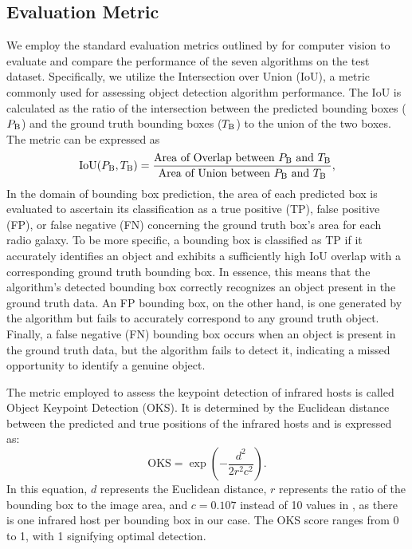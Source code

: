 \documentclass[
  journal=pasa,
  manuscript=research-paper, %
  year=2020,
  volume=37,
]{cup-journal}
\begin{document}
\subsection{Evaluation Metric}
We employ the standard evaluation metrics outlined by \cite{coco14} for computer vision to evaluate and compare the performance of the seven algorithms on the test dataset. 
Specifically, we utilize the Intersection over Union (IoU), a metric commonly used for assessing object detection algorithm performance. 
The IoU is calculated as the ratio of the intersection between the predicted bounding boxes ($P_{\rm B}$) and the ground truth bounding boxes ($T_{\rm B}$) to the union of the two boxes. The metric can be expressed as
\begin{equation}
    \text{IoU}(P_{\rm B}, T_{\rm B}) = \frac{{\text{Area of Overlap between $P_{\rm B}$ and $T_{\rm B}$}}}{{\text{Area of Union between $P_{\rm B}$ and $T_{\rm B}$}}},
\end{equation}
In the domain of bounding box prediction, the area of each predicted box is evaluated to ascertain its classification as a true positive (TP), false positive (FP), or false negative (FN) concerning the ground truth box's area for each radio galaxy.
To be more specific, a bounding box is classified as TP if it accurately identifies an object and exhibits a sufficiently high IoU overlap with a corresponding ground truth bounding box. 
In essence, this means that the algorithm's detected bounding box correctly recognizes an object present in the ground truth data. 
An FP bounding box, on the other hand, is one generated by the algorithm but fails to accurately correspond to any ground truth object. 
Finally, a false negative (FN) bounding box occurs when an object is present in the ground truth data, but the algorithm fails to detect it, indicating a missed opportunity to identify a genuine object.

The metric employed to assess the keypoint detection of infrared hosts is called Object Keypoint Detection (OKS). It is determined by the Euclidean distance between the predicted and true positions of the infrared hosts and is expressed as:
\begin{equation}
\mathrm{OKS} = \exp \left(-\frac{d^2}{2r^2c^2}\right).
\end{equation}
In this equation, $d$ represents the Euclidean distance, $r$ represents the ratio of the bounding box to the image area, and $c=0.107$ instead of 10 values in \cite{coco14}, as there is one infrared host per bounding box in our case. 
The OKS score ranges from 0 to 1, with 1 signifying optimal detection.
\end{document}
